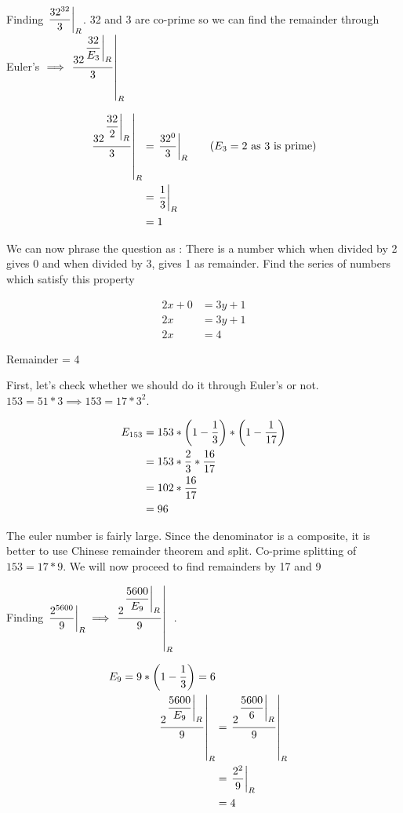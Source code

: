 Finding $\displaystyle{ \left. \frac{32^{32}}{3} \right |_{R} }$. 32 and 3 are co-prime so we can find the remainder through Euler's $\implies \displaystyle{ \left. \frac{32^{ \displaystyle{ \left. \frac{32}{E_{3}} \right |_{R} } }}{3} \right |_{R} }$

\begin{align*}
    \displaystyle{ \left. \frac{32^{ \displaystyle{ \left. \frac{32}{2} \right |_{R} } }}{3} \right |_{R} } &= \displaystyle{ \left. \frac{32^0}{3} \right |_{R} } \tag{$E_3 = 2$ as 3 is prime} \\
    &= \displaystyle{ \left. \frac{1}{3} \right |_{R} } \\
    &= 1
\end{align*}

We can now phrase the question as : There is a number which when divided by 2 gives 0 and when divided by 3, gives 1 as remainder. Find the series of numbers which satisfy this property

\begin{align*}
    2x + 0 &= 3y + 1 \\
    2x &= 3y + 1 \\
    2x &= 4 \tag{$y=1 \implies x=2$}
\end{align*}

Remainder = 4


First, let's check whether we should do it through Euler's or not. $153 = 51 * 3 \implies 153 = 17 * 3^2$. 

\begin{align*}
    E_{153} &= 153 * \left ( 1 - \dfrac{1}{3} \right ) * \left ( 1 - \dfrac{1}{17} \right ) \\
    &= 153 * \dfrac{2}{3} * \dfrac{16}{17} \\
    &= 102 * \dfrac{16}{17} \\
    &= 96
\end{align*}

The euler number is fairly large. Since the denominator is a composite, it is better to use Chinese remainder theorem and split. Co-prime splitting of $153 = 17 * 9$. We will now proceed to find remainders by 17 and 9

Finding $\displaystyle{ \left. \frac{2^{5600}}{9} \right |_{R} } \implies \displaystyle{ \left. \frac{2^{ \displaystyle{ \left. \frac{5600}{E_{9}} \right |_{R} } }}{9} \right |_{R} }$. 

\begin{align*}
    E_9 = 9 * \left ( 1 - \dfrac{1}{3} \right ) = 6 \\
    \displaystyle{ \left. \frac{2^{ \displaystyle{ \left. \frac{5600}{E_{9}} \right |_{R} } }}{9} \right |_{R} } &= \displaystyle{ \left. \frac{2^{ \displaystyle{ \left. \frac{5600}{6} \right |_{R} } }}{ 9} \right |_{R} } \\
    &= \displaystyle{ \left. \frac{2^{2}}{ 9} \right |_{R} } \\
    &= 4
\end{align*}

